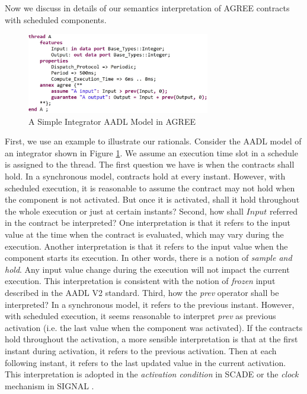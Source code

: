 Now we discuss in details of our semantics interpretation of AGREE contracts with scheduled components.
\begin{figure}[ht!]
\centering
\includegraphics[width=80mm]{pre.jpg}
\caption{A Simple Integrator AADL Model in AGREE\label{integratorFig}}
\end{figure}

First, we use an example to illustrate our rationals. Consider the AADL model of an integrator shown in Figure \ref{integratorFig}. We assume an execution time slot in a schedule is assigned to the thread.  
The first question we have is when the contracts shall hold. In a synchronous model, contracts hold at every instant. However, with scheduled execution, it is reasonable to assume the contract may not hold when the component is not activated. But once it is activated, shall it hold throughout the whole execution or just at certain instants? Second, how shall $Input$ referred in the contract be interpreted? One interpretation is that it refers to the input value at the time when the contract is evaluated, which may vary during the execution. Another interpretation is that it refers to the input value when the component starts its execution. In other words, there is a notion of \emph{sample and hold}. Any input value change during the execution will not impact the current execution. This interpretation is consistent with the notion of \emph{frozen} input described in the AADL V2 standard. Third, how the \emph{prev} operator shall be interpreted? In a synchronous model, it refers to the previous instant. However, with scheduled execution, it seems reasonable to interpret \emph{prev} as previous activation (i.e. the last value when the component was activated). If the contracts hold throughout the activation, a more sensible interpretation is that at the first instant during activation, it refers to the previous activation. Then at each following instant, it refers to the last updated value in the current activation. This interpretation is adopted in the \emph{activation condition} in SCADE \cite{scade} or the \emph{clock} mechanism in SIGNAL \cite{signal}.

